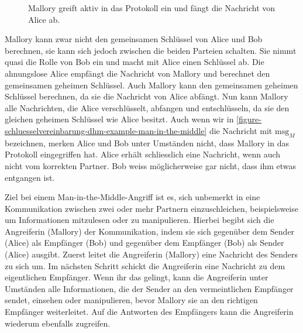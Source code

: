 \begin{figure}[htb]
\caption{Mallory greift aktiv in das Protokoll ein und fängt die Nachricht von Alice ab.}
\label{figure-schluesselvereinbarung-dhm-example-man-in-the-middle}
\end{figure}

Mallory kann zwar nicht den gemeinsamen Schlüssel von Alice und Bob berechnen, sie kann sich jedoch zwischen die beiden Parteien schalten. Sie nimmt quasi die Rolle von Bob ein und macht mit Alice einen Schlüssel ab. Die ahnungslose Alice empfängt die Nachricht von Mallory und berechnet den gemeinsamen geheimen Schlüssel. Auch Mallory kann den gemeinsamen geheimen Schlüssel berechnen, da sie die Nachricht von Alice abfängt. Nun kann Mallory alle Nachrichten, die Alice verschlüsselt, abfangen und entschlüsseln, da sie den gleichen geheimen Schlüssel wie Alice besitzt. Auch wenn wir in \autoref{figure-schluesselvereinbarung-dhm-example-man-in-the-middle} die Nachricht mit $\text{msg}_M$ bezeichnen, merken Alice und Bob unter Umständen nicht, dass Mallory in das Protokoll eingegriffen hat. Alice erhält schliesslich eine Nachricht, wenn auch nicht vom korrekten Partner. Bob weiss möglicherweise gar nicht, dass ihm etwas entgangen ist.


\begin{definition}
	Ziel bei einem Man-in-the-Middle-Angriff ist es, sich unbemerkt in eine Kommunikation zwischen zwei oder mehr Partnern einzuschleichen, beispielsweise um Informationen mitzulesen oder zu manipulieren. Hierbei begibt sich die Angreiferin (Mallory)  der Kommunikation, indem sie sich gegenüber dem Sender (Alice) als Empfänger (Bob) und gegenüber dem Empfänger (Bob) als Sender (Alice) ausgibt. Zuerst leitet die Angreiferin (Mallory) eine Nachricht des Senders zu sich um. Im nächsten Schritt schickt die Angreiferin eine Nachricht zu dem eigentlichen Empfänger. Wenn ihr das gelingt, kann die Angreiferin unter Umständen alle Informationen, die der Sender an den vermeintlichen Empfänger sendet, einsehen oder manipulieren, bevor Mallory sie an den richtigen Empfänger weiterleitet. Auf die Antworten des Empfängers kann die Angreiferin wiederum ebenfalls zugreifen.
\end{definition}

